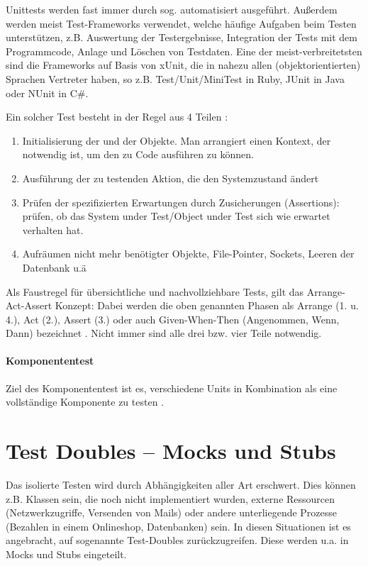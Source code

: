 Unittests werden fast immer durch sog.  automatisiert ausgeführt. Außerdem werden meist Test-Frameworks verwendet, welche häufige Aufgaben beim Testen unterstützen, z.B. Auswertung der Testergebnisse, Integration der Tests mit dem Programmcode, Anlage und Löschen von Testdaten.  Eine der meist-verbreitetsten sind die Frameworks auf Basis von xUnit, die in nahezu allen (objektorientierten) Sprachen Vertreter haben, so z.B. Test/Unit/MiniTest in Ruby, JUnit in Java oder NUnit in C\#.

Ein solcher Test besteht in der Regel aus 4 Teilen \citep{rappin_rails_2011} \citep[Karte 46]{langr_agile_2011}:
\begin{enumerate}
 \item Initialisierung der  und der Objekte. Man arrangiert einen Kontext, der notwendig ist, um den zu Code ausführen zu können.
 \item Ausführung der zu testenden Aktion, die den Systemzustand ändert
 \item Prüfen der spezifizierten Erwartungen durch Zusicherungen (Assertions): prüfen, ob das System under Test/Object under Test sich wie erwartet verhalten hat.
 \item Aufräumen nicht mehr benötigter Objekte, File-Pointer, Sockets, Leeren der Datenbank u.ä
\end{enumerate}
Als Faustregel für übersichtliche und nachvollziehbare Tests, gilt das Arrange-Act-Assert Konzept: Dabei werden die oben genannten Phasen als Arrange (1. u. 4.), Act (2.), Assert (3.) oder auch Given-When-Then (Angenommen, Wenn, Dann) bezeichnet \citep[Karte 46]{langr_agile_2011}. Nicht immer sind alle drei bzw. vier Teile notwendig.

\paragraph{Komponententest}
Ziel des Komponententest ist es, verschiedene Units in Kombination als eine vollständige Komponente zu testen \citep{goodliffe_code_2006}.

 \section{Test Doubles -- Mocks und Stubs}
  \label{sec:mocks}
  Das isolierte Testen wird durch Abhängigkeiten aller Art erschwert. Dies können z.B. Klassen sein, die noch nicht implementiert wurden, externe Ressourcen (Netzwerkzugriffe, Versenden von Mails) oder andere unterliegende Prozesse (Bezahlen in einem Onlineshop, Datenbanken) sein. In diesen Situationen ist es angebracht, auf sogenannte Test-Doubles zurückzugreifen. Diese werden u.a. in Mocks und Stubs eingeteilt.

